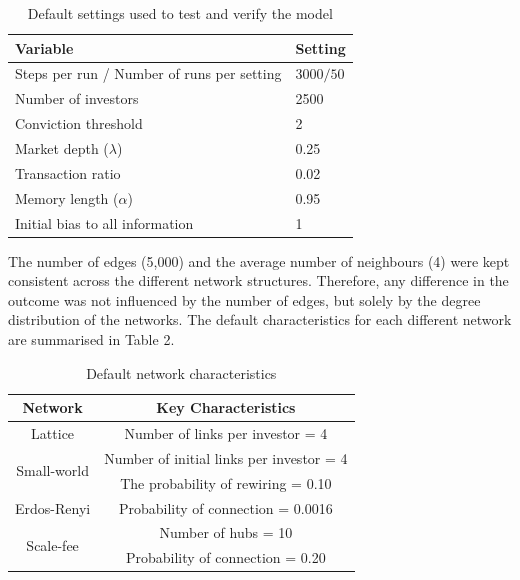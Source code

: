 \documentclass[runningheads]{llncs}
\begin{document}
    
\begin{table}[H]
\caption{Default settings used to test and verify the model}\label{tab1}
\begin{center}
    
\begin{tabular}{|l|l|}
\hline
\textbf{Variable}                            & \textbf{Setting} \\ \hline
Steps per run / Number of   runs per setting & $3000/50$         \\ \hline
Number of investors                          & 2500             \\ \hline
Conviction threshold                         & 2                \\ \hline
Market depth ($\lambda$)                             & 0.25             \\ \hline
Transaction ratio                            & 0.02             \\ \hline
Memory length ($\alpha$)                            & 0.95             \\ \hline
Initial bias to all   information            & 1                \\ \hline
\end{tabular}
\end{center}
\end{table}
The number of edges (5,000) and the average number of neighbours (4) were kept consistent across the different network structures. Therefore, any difference in the outcome was not influenced by the number of edges, but solely by the degree distribution of the networks. The default characteristics for each different network are summarised in Table 2. 
\begin{table}[H]
\caption{Default network characteristics}\label{tab2}
\begin{center}
\begin{tabular}{|c|c|}
\hline
\textbf{Network}             & \textbf{Key Characteristics}               \\ \hline
Lattice                      & Number of links per investor =  4          \\ \hline
\multirow{2}{*}{Small-world} & Number of   initial links per investor = 4 \\ \cline{2-2} 
                             & The probability of rewiring   = 0.10       \\ \hline
Erdos-Renyi                  & Probability of   connection = 0.0016       \\ \hline
\multirow{2}{*}{Scale-fee}   & Number of hubs = 10                        \\ \cline{2-2} 
                             & Probability of connection =   0.20         \\ \hline
\end{tabular}
\end{center}
\end{table}
\end{document}
